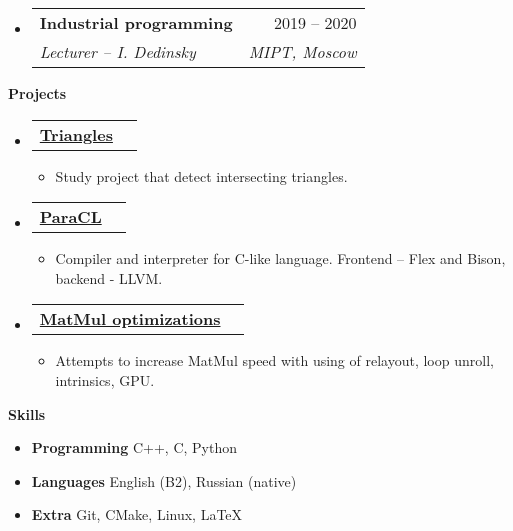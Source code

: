 \documentclass[letterpaper,12pt]{article}[leftmargin=*]
\makeatletter
\def \entryspacing {-0pt}
\renewcommand{\section}[2]{\vspace{5pt}
  \colorbox{secondary}{\color{white}\raggedbottom\normalsize\textbf{{#1}{\hspace{7pt}#2}}}
}
\newcommand{\resumeEntryStart}{\begin{itemize}[leftmargin=2.5mm]}
\newcommand{\resumeEntryEnd}{\end{itemize}\vspace{\entryspacing}}
\newcommand{\resumeItemListStart}{\begin{itemize}[leftmargin=4.5mm]}
\newcommand{\resumeItemListEnd}{\end{itemize}}
\newcommand{\resumeItem}[1]{
  \item\small{
    {#1 \vspace{-2pt}}
  }
}
\newcommand{\resumeEntryTSDL}[4]{
  \vspace{-1pt}\item[]
    \begin{tabularx}{0.97\textwidth}{X@{\hspace{60pt}}r}
      \textbf{\color{primary}#1} & {\firabook\color{accent}\small#2} \\
      \textit{\color{accent}\small#3} & \textit{\color{accent}\small#4} \\
    \end{tabularx}\vspace{-6pt}
}
\newcommand{\resumeEntryTD}[2]{
  \vspace{-1pt}\item[]
    \begin{tabularx}{0.97\textwidth}{X@{\hspace{60pt}}r}
      \textbf{\color{primary}#1} & {\firabook\color{accent}\small#2} \\
    \end{tabularx}\vspace{-6pt}
}
\newcommand{\resumeEntryS}[2]{
  \item[]\small{
    \textbf{\color{primary}#1 }{ #2 \vspace{-6pt}}
  }
}
\makeatother
\begin{document}
  \resumeEntryStart
    \resumeEntryTSDL
      {Industrial programming}{2019 -- 2020}
      {Lecturer -- I. Dedinsky}{MIPT, Moscow}
  \resumeEntryEnd
\section{\faFlask}{Projects}

  \resumeEntryStart
    \resumeEntryTD
      {\href{https://github.com/106-inc/Triangles}{Triangles}}{}
    \resumeItemListStart
      \resumeItem {Study project that detect intersecting triangles.}
    \resumeItemListEnd
  \resumeEntryEnd

  \resumeEntryStart
    \resumeEntryTD
      {\href{https://github.com/106-inc/ParaCL}{ParaCL}}{}
    \resumeItemListStart
      \resumeItem {Compiler and interpreter for C-like language. Frontend -- Flex and Bison, backend - LLVM.}
    \resumeItemListEnd
  \resumeEntryEnd

  \resumeEntryStart
    \resumeEntryTD
      {\href{https://github.com/106-inc/ParaCL}{MatMul optimizations}}{}
    \resumeItemListStart
      \resumeItem {Attempts to increase MatMul speed with using of relayout, loop unroll, intrinsics, GPU.}
    \resumeItemListEnd
  \resumeEntryEnd

\section{\faGears}{Skills}
 \resumeEntryStart
  \resumeEntryS{Programming } {C++, C, Python}
  \resumeEntryS{Languages } {English (B2), Russian (native)}
  \resumeEntryS{Extra}{Git, CMake, Linux, \LaTeX}
 \resumeEntryEnd
\end{document}
